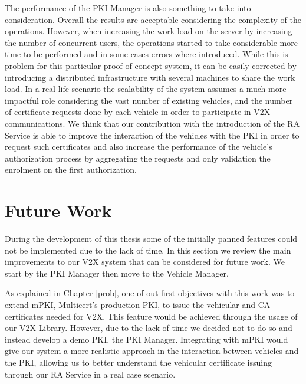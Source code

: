 The performance of the PKI Manager is also something to take into consideration. Overall the results are acceptable considering the complexity of the operations. However, when increasing the work load on the server by increasing the number of concurrent users, the operations started to take considerable more time to be performed and in some cases errors where introduced. While this is problem for this particular proof of concept system, it can be easily corrected by introducing a distributed infrastructure with several machines to share the work load. In a real life scenario the scalability of the system assumes a much more impactful role considering the vast number of existing vehicles, and the number of certificate requests done by each vehicle in order to participate in V2X communications. We think that our contribution with the introduction of the RA Service is able to improve the interaction of the vehicles with the PKI in order to request such certificates and also increase the performance of the vehicle's authorization process by aggregating the requests and only validation the enrolment on the first authorization.






\section{Future Work}
\label{section:future}

During the development of this thesis some of the initially panned features could not be implemented due to the lack of time. In this section we review the main improvements to our V2X system that can be considered for future work. We start by the PKI Manager then move to the Vehicle Manager.

As explained in Chapter \ref{prob}, one of out first objectives with this work was to extend mPKI, Multicert's production PKI, to issue the vehicular and CA certificates needed for V2X. This feature would be achieved through the usage of our V2X Library. However, due to the lack of time we decided not to do so and instead develop a demo PKI, the PKI Manager. Integrating with mPKI would give our system a more realistic approach in the interaction between vehicles and the PKI, allowing us to better understand the vehicular certificate issuing through our RA Service in a real case scenario. 

